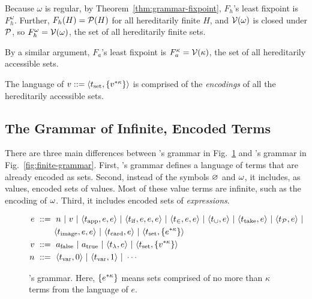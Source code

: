 \begin{example}
Because $\omega$ is regular, by Theorem~\ref{thm:grammar-fixpoint},  $F_h$'s least fixpoint is $F_h^\omega$.
Further, $F_h(H) = \mathcal{P}(H)$ for all hereditarily finite $H$, and $\mathcal{V}(\omega)$ is closed under $\mathcal{P}$, so $F_h^\omega = \mathcal{V}(\omega)$, the set of all hereditarily finite sets.
\exampleqed
\end{example}

\begin{example}
By a similar argument, $F_a$'s least fixpoint is $F_a^\kappa = \mathcal{V}(\kappa)$, the set of all hereditarily accessible sets.
\exampleqed
\end{example}

\begin{example}
The language of $v ::= \langle{t_\mathrm{set},\ensuremath{\{{{v}^{*{\kappa}}}\}}}\rangle$ is comprised of the \emph{encodings} of all the hereditarily accessible sets.
\exampleqed
\end{example}

\subsection{The Grammar of Infinite, Encoded Terms}

There are three main differences between \targetlang's grammar in Fig.~\ref{fig:grammar} and \ftargetlang's grammar in Fig.~\ref{fig:finite-grammar}. First, \targetlang's grammar defines a language of terms that are already encoded as sets. Second, instead of the symbols $\varnothing$ and $\omega$, it includes, as values, encoded sets of values. Most of these value terms are infinite, such as the encoding of $\omega$. Third, it includes encoded sets of \emph{expressions}.

\begin{figure*}[tb]\centering
\begin{equation*}
\begin{aligned}
	e &\ ::=\ n \ |\  v \ |\  \langle{t_\mathrm{app},e,e}\rangle \ |\  \langle{t_\mathrm{if},e,e,e}\rangle \ |\  \langle{t_\in,e,e}\rangle \ |\ 
		\langle{t_\cup,e}\rangle \ |\  \langle{t_\mathrm{take},e}\rangle \ |\  \langle{t_{\mathcal{P}},e}\rangle \ |\  \\
		&\ \ \ \ \ \ \ \langle{t_\mathrm{image},e,e}\rangle \ |\  \langle{t_\mathrm{card},e}\rangle \ |\  \langle{t_\mathrm{set},\ensuremath{\{{{e}^{*{\kappa}}}\}}}\rangle \\
	v &\ ::=\ a_\mathrm{false} \ |\  a_\mathrm{true} \ |\  \langle{t_\lambda,e}\rangle \ |\  \langle{t_\mathrm{set},\ensuremath{\{{{v}^{*{\kappa}}}\}}}\rangle \\
	n &\ ::=\ \langle{t_\mathrm{var},0}\rangle \ |\  \langle{t_\mathrm{var},1}\rangle \ |\  \cdots
\end{aligned}
\end{equation*}
\bottomhrule
\caption[\targetlang's grammar]{\targetlang's grammar. Here, $\{{{e}^{*{\kappa}}}\}$ means sets comprised of no more than $\kappa$ terms from the language of $e$.}
\label{fig:grammar}
\end{figure*}

